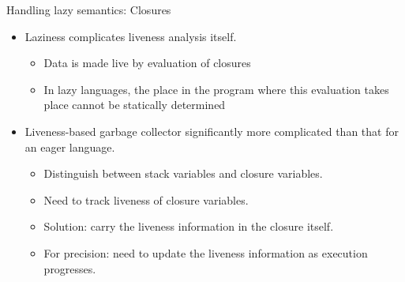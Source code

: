 \documentclass[xcolor=x11names,compress,mathserif]{beamer}
\renewcommand{\(}{\begin{columns}}
\renewcommand{\)}{\end{columns}}
\newcommand{\<}[1]{\begin{column}{#1}}
\renewcommand{\>}{\end{column}}
\begin{document}
\begin{frame}{Handling lazy semantics: Closures}
\normalsize
  \begin{itemize}\itemsep2em
  \item Laziness complicates liveness analysis itself. 
    \begin{itemize}
    \item Data is made live by evaluation of closures
    \item In lazy languages, the place in the program
      where this evaluation takes place cannot be statically determined
    \end{itemize}
    \pause
  \item Liveness-based garbage collector significantly more complicated than that for an eager language.
    \begin{itemize}
    \item Distinguish between stack variables and closure variables.
    \item Need to track liveness of closure variables.
    \item Solution: carry the liveness information in the closure itself.
    \item For precision: need to update the liveness information as execution progresses.
    \end{itemize}
  \end{itemize}
\end{frame}
\end{document}
